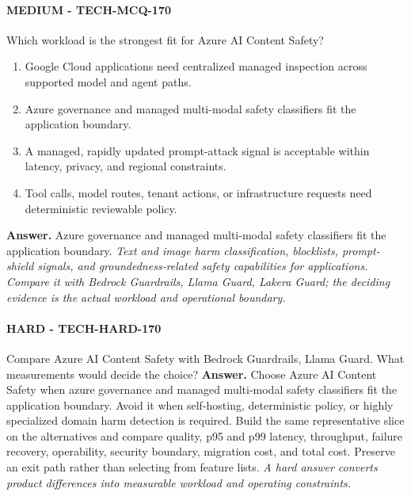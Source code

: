\paragraph{MEDIUM - TECH-MCQ-170} Which workload is the strongest fit for Azure AI Content Safety?
\begin{enumerate}[label=\Alph*.]
\item Google Cloud applications need centralized managed inspection across supported model and agent paths.
\item Azure governance and managed multi-modal safety classifiers fit the application boundary.
\item A managed, rapidly updated prompt-attack signal is acceptable within latency, privacy, and regional constraints.
\item Tool calls, model routes, tenant actions, or infrastructure requests need deterministic reviewable policy.
\end{enumerate}
\textbf{Answer.} Azure governance and managed multi-modal safety classifiers fit the application boundary.
\textit{Text and image harm classification, blocklists, prompt-shield signals, and groundedness-related safety capabilities for applications. Compare it with Bedrock Guardrails, Llama Guard, Lakera Guard; the deciding evidence is the actual workload and operational boundary.}
\paragraph{HARD - TECH-HARD-170} Compare Azure AI Content Safety with Bedrock Guardrails, Llama Guard. What measurements would decide the choice?
\textbf{Answer.} Choose Azure AI Content Safety when azure governance and managed multi-modal safety classifiers fit the application boundary. Avoid it when self-hosting, deterministic policy, or highly specialized domain harm detection is required. Build the same representative slice on the alternatives and compare quality, p95 and p99 latency, throughput, failure recovery, operability, security boundary, migration cost, and total cost. Preserve an exit path rather than selecting from feature lists.
\textit{A hard answer converts product differences into measurable workload and operating constraints.}
